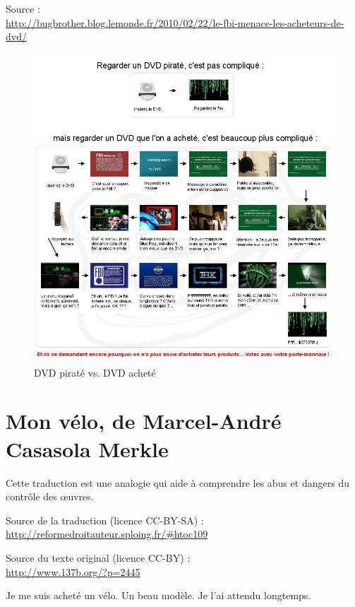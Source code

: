 Source :\\
\url{http://bugbrother.blog.lemonde.fr/2010/02/22/le-fbi-menace-les-acheteurs-de-dvd/}

\newpage

\begin{figure}[H]
\center
\includegraphics[scale=.602]{images/dvd-legal-dvd-illegal.jpg}
\caption{DVD piraté vs. DVD acheté}
\end{figure}

\chapter{Mon vélo, de Marcel-André Casasola Merkle}
\label{annexe-velo}

Cette traduction est une analogie qui aide à comprendre les abus et dangers du contrôle des œuvres.

Source de la traduction (licence CC-BY-SA) :\\
\url{http://reformedroitauteur.sploing.fr/\#htoc109}

Source du texte original (licence CC-BY) :\\
\url{http://www.137b.org/?p=2445}

\newpage

Je me suis acheté un vélo. Un beau modèle. Je l’ai attendu longtemps.

